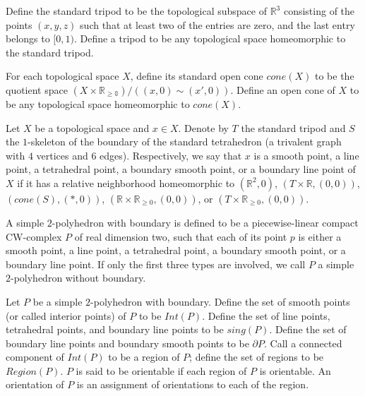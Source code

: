 \begin{definition}[tripod]\label{def/tripod}
  Define the standard tripod to be the topological subspace of
  $\mathbb{R}^{3}$ consisting of the points $(x,y,z)$ such that
  at least two of the entries are zero, and the last entry
  belongs to $[0,1)$. Define a tripod to be any topological space
  homeomorphic to the standard tripod.
\end{definition}

\begin{definition}[cone]\label{def/cone}
  For each topological space $X$, define its standard open cone
  $cone(X)$ to be the quotient space
  $(X \times \mathbb{R_{\geq 0}})/((x,0) \sim (x',0)).$ Define an
  open cone of $X$ to be any topological space homeomorphic to
  $cone(X)$.
\end{definition}

\begin{definition}\label{def/local-shape}
  Let $X$ be a topological space and $x \in X$. Denote by $T$ the
  standard tripod and $S$ the $1$-skeleton of the boundary of the
  standard tetrahedron (a trivalent graph with $4$ vertices and
  $6$ edges). Respectively, we say that $x$ is a smooth point, a
  line point, a tetrahedral point, a boundary smooth point, or a
  boundary line point of $X$ if it has a relative neighborhood
  homeomorphic to $(\mathbb{R}^{2},0)$,
  $(T \times \mathbb{R}, (0, 0))$, $(cone(S), (*, 0))$,
  $(\mathbb{R} \times \mathbb{R}_{\geq 0}, (0, 0))$, or
  $(T \times \mathbb{R}_{\geq 0}, (0, 0))$.
\end{definition}

\begin{definition}\label{def/simple-2-polyhedron}
  A simple $2$-polyhedron with boundary is defined to be a
  piecewise-linear compact CW-complex $P$ of real dimension two,
  such that each of its point $p$ is either a smooth point, a
  line point, a tetrahedral point, a boundary smooth point, or a
  boundary line point. If only the first three types are
  involved, we call $P$ a simple $2$-polyhedron without boundary.
\end{definition}

\begin{definition}\label{def/components-of-a-simple-2-polyhedron}
  Let $P$ be a simple $2$-polyhedron with boundary. Define the
  set of smooth points (or called interior points) of $P$ to be
  $Int(P)$. Define the set of line points, tetrahedral points,
  and boundary line points to be $sing(P)$. Define the set of
  boundary line points and boundary smooth points to be
  $\partial P$. Call a connected component of $Int(P)$ to be a
  region of $P$; define the set of regions to be $Region(P)$. $P$
  is said to be orientable if each region of $P$ is orientable.
  An orientation of $P$ is an assignment of orientations to each
  of the region.
\end{definition}

